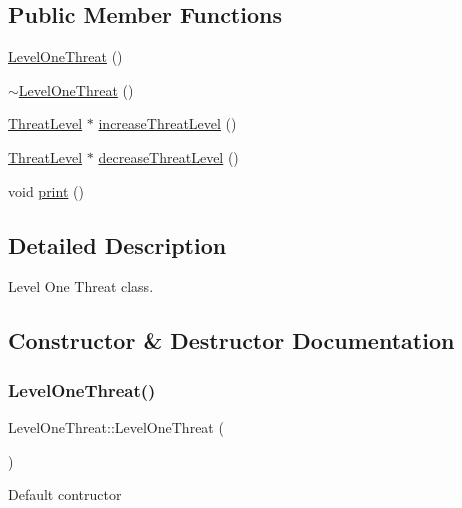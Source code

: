 \subsection*{Public Member Functions}
\begin{DoxyCompactItemize}
\item 
\hyperlink{classLevelOneThreat_ae90b42ebcce70476ff405ccdcde0627e}{Level\+One\+Threat} ()
\item 
\hyperlink{classLevelOneThreat_a1c6e77c98473057eef8fe66f0e325fcf}{$\sim$\+Level\+One\+Threat} ()
\item 
\hyperlink{classThreatLevel}{Threat\+Level} $\ast$ \hyperlink{classLevelOneThreat_afc68f742f1101cb8d533d8cec21bac3f}{increase\+Threat\+Level} ()
\item 
\hyperlink{classThreatLevel}{Threat\+Level} $\ast$ \hyperlink{classLevelOneThreat_a9a2899ac02e075905671ea03374cd561}{decrease\+Threat\+Level} ()
\item 
void \hyperlink{classLevelOneThreat_a902492d8341a398b0209fb89e2aca68e}{print} ()
\end{DoxyCompactItemize}


\subsection{Detailed Description}
Level One Threat class. 

\subsection{Constructor \& Destructor Documentation}
\mbox{\label{classLevelOneThreat_ae90b42ebcce70476ff405ccdcde0627e}} 
\subsubsection{\texorpdfstring{Level\+One\+Threat()}{LevelOneThreat()}}
{\footnotesize\ttfamily Level\+One\+Threat\+::\+Level\+One\+Threat (\begin{DoxyParamCaption}{ }\end{DoxyParamCaption})}

Default contructor \mbox{\label{classLevelOneThreat_a1c6e77c98473057eef8fe66f0e325fcf}} 
